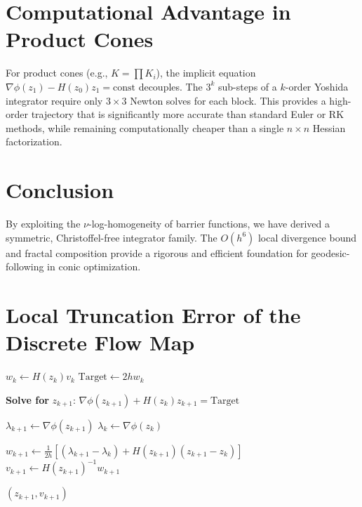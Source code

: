 \documentclass[11pt,a4paper]{article}
\begin{document}
\section{Computational Advantage in Product Cones}
For product cones (e.g., $K = \prod K_i$), the implicit equation $\nabla \phi(z_1) - H(z_0)z_1 = \text{const}$ decouples. The $3^k$ sub-steps of a $k$-order Yoshida integrator require only $3 \times 3$ Newton solves for each block. This provides a high-order trajectory that is significantly more accurate than standard Euler or RK methods, while remaining computationally cheaper than a single $n \times n$ Hessian factorization.

\section{Conclusion}
By exploiting the $\nu$-log-homogeneity of barrier functions, we have derived a symmetric, Christoffel-free integrator family. The $O(h^6)$ local divergence bound and fractal composition provide a rigorous and efficient foundation for geodesic-following in conic optimization.


\section{Local Truncation Error of the Discrete Flow Map}


\begin{algorithm}
\caption{Symmetric Geodesic Step (Log-Homogeneous)}
\label{alg:symmetric_step}
\begin{algorithmic}[1]

\State $w_k \gets H(z_k)v_k$ 
\State $\text{Target} \gets 2h w_k$ 

\State \textbf{Solve for } $z_{k+1}$: 
\State \quad $\nabla \phi(z_{k+1}) + H(z_k)z_{k+1} = \text{Target}$ \label{alg:implicit_solve}

\State $\lambda_{k+1} \gets \nabla \phi(z_{k+1})$
\State $\lambda_k \gets \nabla \phi(z_k)$ 

\State $w_{k+1} \gets \frac{1}{2h} \left[ (\lambda_{k+1} - \lambda_k) + H(z_{k+1})(z_{k+1} - z_k) \right]$ \label{alg:momentum_update}
\State $v_{k+1} \gets H(z_{k+1})^{-1} w_{k+1}$ 

\State \Return $(z_{k+1}, v_{k+1})$
\end{algorithmic}
\end{algorithm}
\end{document}
